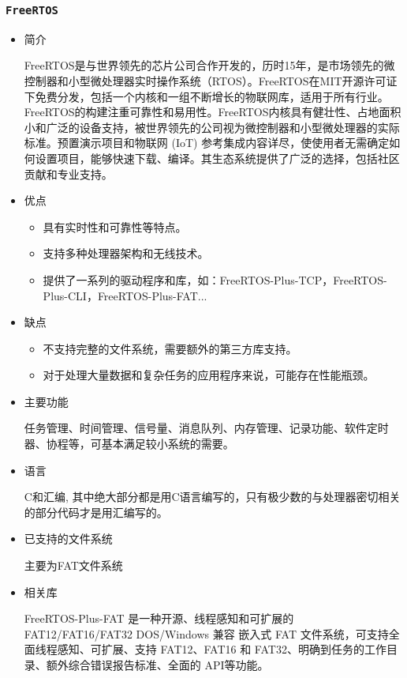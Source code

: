 \documentclass[UTF8,a4paper]{ctexart}
\begin{document}
\subsubsection{\texttt{FreeRTOS}}
\begin{itemize}
\item 简介

FreeRTOS是与世界领先的芯片公司合作开发的，历时15年，是市场领先的微控制器和小型微处理器实时操作系统（RTOS）。FreeRTOS在MIT开源许可证下免费分发，包括一个内核和一组不断增长的物联网库，适用于所有行业。FreeRTOS的构建注重可靠性和易用性。FreeRTOS内核具有健壮性、占地面积小和广泛的设备支持，被世界领先的公司视为微控制器和小型微处理器的实际标准。预置演示项目和物联网 (IoT) 参考集成内容详尽，使使用者无需确定如何设置项目，能够快速下载、编译。其生态系统提供了广泛的选择，包括社区贡献和专业支持。

\item 优点
\begin{itemize}
    \item 具有实时性和可靠性等特点。
    \item 支持多种处理器架构和无线技术。
    \item 提供了一系列的驱动程序和库，如：FreeRTOS-Plus-TCP，FreeRTOS-Plus-CLI，FreeRTOS-Plus-FAT...   
\end{itemize}
\item 缺点
\begin{itemize}
    \item 不支持完整的文件系统，需要额外的第三方库支持。
    \item 对于处理大量数据和复杂任务的应用程序来说，可能存在性能瓶颈。     
\end{itemize}
\item 主要功能

任务管理、时间管理、信号量、消息队列、内存管理、记录功能、软件定时器、协程等，可基本满足较小系统的需要。
\item 语言

C和汇编, 其中绝大部分都是用C语言编写的，只有极少数的与处理器密切相关的部分代码才是用汇编写的。
\item 已支持的文件系统

主要为FAT文件系统
\item 相关库

FreeRTOS-Plus-FAT 是一种开源、线程感知和可扩展的 FAT12/FAT16/FAT32 DOS/Windows 兼容 嵌入式 FAT 文件系统，可支持全面线程感知、可扩展、支持 FAT12、FAT16 和 FAT32、明确到任务的工作目录、额外综合错误报告标准、全面的 API等功能。
\end{itemize}
\end{document}
